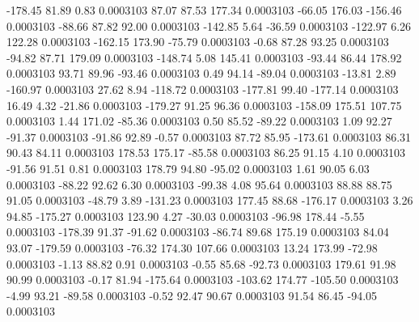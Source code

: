      -178.45       81.89        0.83     0.0003103
       87.07       87.53      177.34     0.0003103
      -66.05      176.03     -156.46     0.0003103
      -88.66       87.82       92.00     0.0003103
     -142.85        5.64      -36.59     0.0003103
     -122.97        6.26      122.28     0.0003103
     -162.15      173.90      -75.79     0.0003103
       -0.68       87.28       93.25     0.0003103
      -94.82       87.71      179.09     0.0003103
     -148.74        5.08      145.41     0.0003103
      -93.44       86.44      178.92     0.0003103
       93.71       89.96      -93.46     0.0003103
        0.49       94.14      -89.04     0.0003103
      -13.81        2.89     -160.97     0.0003103
       27.62        8.94     -118.72     0.0003103
     -177.81       99.40     -177.14     0.0003103
       16.49        4.32      -21.86     0.0003103
     -179.27       91.25       96.36     0.0003103
     -158.09      175.51      107.75     0.0003103
        1.44      171.02      -85.36     0.0003103
        0.50       85.52      -89.22     0.0003103
        1.09       92.27      -91.37     0.0003103
      -91.86       92.89       -0.57     0.0003103
       87.72       85.95     -173.61     0.0003103
       86.31       90.43       84.11     0.0003103
      178.53      175.17      -85.58     0.0003103
       86.25       91.15        4.10     0.0003103
      -91.56       91.51        0.81     0.0003103
      178.79       94.80      -95.02     0.0003103
        1.61       90.05        6.03     0.0003103
      -88.22       92.62        6.30     0.0003103
      -99.38        4.08       95.64     0.0003103
       88.88       88.75       91.05     0.0003103
      -48.79        3.89     -131.23     0.0003103
      177.45       88.68     -176.17     0.0003103
        3.26       94.85     -175.27     0.0003103
      123.90        4.27      -30.03     0.0003103
      -96.98      178.44       -5.55     0.0003103
     -178.39       91.37      -91.62     0.0003103
      -86.74       89.68      175.19     0.0003103
       84.04       93.07     -179.59     0.0003103
      -76.32      174.30      107.66     0.0003103
       13.24      173.99      -72.98     0.0003103
       -1.13       88.82        0.91     0.0003103
       -0.55       85.68      -92.73     0.0003103
      179.61       91.98       90.99     0.0003103
       -0.17       81.94     -175.64     0.0003103
     -103.62      174.77     -105.50     0.0003103
       -4.99       93.21      -89.58     0.0003103
       -0.52       92.47       90.67     0.0003103
       91.54       86.45      -94.05     0.0003103
